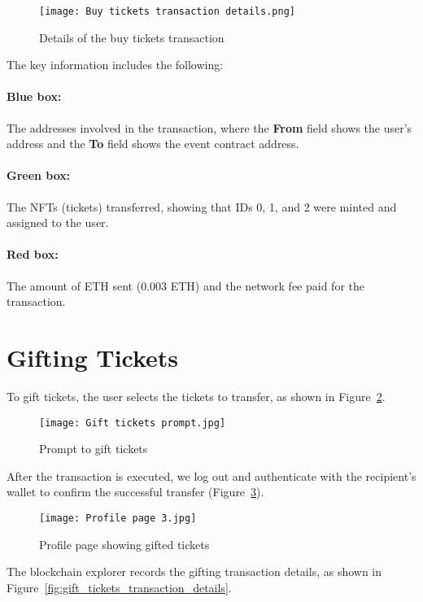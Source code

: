 \begin{figure}[H]
    \texttt{[image: Buy tickets transaction details.png]}
    \centering
    \caption{Details of the buy tickets transaction}\label{fig:buy_tickets_transaction_details}
\end{figure}

The key information includes the following:
\paragraph{Blue box:} The addresses involved in the transaction, where the \textbf{From} field shows
the user's address and the \textbf{To} field shows the event contract address.
\paragraph{Green box:} The NFTs (tickets) transferred, showing that IDs 0, 1, and 2 were minted and
assigned to the user.
\paragraph{Red box:} The amount of ETH sent (0.003 ETH) and the network fee paid for the
transaction.

\section{Gifting Tickets}\label{sec:gifting_tickets}

To gift tickets, the user selects the tickets to transfer, as shown in
Figure~\ref{fig:gift_tickets_prompt}.

\begin{figure}[H]
    \texttt{[image: Gift tickets prompt.jpg]}
    \centering
    \caption{Prompt to gift tickets}\label{fig:gift_tickets_prompt}
\end{figure}

After the transaction is executed, we log out and authenticate with the
recipient's wallet to confirm the successful transfer
(Figure~\ref{fig:profile_page_3}).

\begin{figure}[H]
    \texttt{[image: Profile page 3.jpg]}
    \centering
    \caption{Profile page showing gifted tickets}\label{fig:profile_page_3}
\end{figure}

The blockchain explorer records the gifting transaction details, as shown in
Figure~\ref{fig:gift_tickets_transaction_details}.

